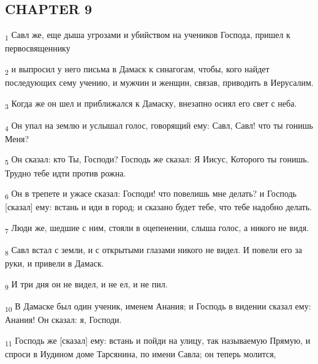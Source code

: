 \subsection{CHAPTER 9}
\begin{tcolorbox}
\textsubscript{1} Савл же, еще дыша угрозами и убийством на учеников Господа, пришел к первосвященнику
\end{tcolorbox}
\begin{tcolorbox}
\textsubscript{2} и выпросил у него письма в Дамаск к синагогам, чтобы, кого найдет последующих сему учению, и мужчин и женщин, связав, приводить в Иерусалим.
\end{tcolorbox}
\begin{tcolorbox}
\textsubscript{3} Когда же он шел и приближался к Дамаску, внезапно осиял его свет с неба.
\end{tcolorbox}
\begin{tcolorbox}
\textsubscript{4} Он упал на землю и услышал голос, говорящий ему: Савл, Савл! что ты гонишь Меня?
\end{tcolorbox}
\begin{tcolorbox}
\textsubscript{5} Он сказал: кто Ты, Господи? Господь же сказал: Я Иисус, Которого ты гонишь. Трудно тебе идти против рожна.
\end{tcolorbox}
\begin{tcolorbox}
\textsubscript{6} Он в трепете и ужасе сказал: Господи! что повелишь мне делать? и Господь [сказал] ему: встань и иди в город; и сказано будет тебе, что тебе надобно делать.
\end{tcolorbox}
\begin{tcolorbox}
\textsubscript{7} Люди же, шедшие с ним, стояли в оцепенении, слыша голос, а никого не видя.
\end{tcolorbox}
\begin{tcolorbox}
\textsubscript{8} Савл встал с земли, и с открытыми глазами никого не видел. И повели его за руки, и привели в Дамаск.
\end{tcolorbox}
\begin{tcolorbox}
\textsubscript{9} И три дня он не видел, и не ел, и не пил.
\end{tcolorbox}
\begin{tcolorbox}
\textsubscript{10} В Дамаске был один ученик, именем Анания; и Господь в видении сказал ему: Анания! Он сказал: я, Господи.
\end{tcolorbox}
\begin{tcolorbox}
\textsubscript{11} Господь же [сказал] ему: встань и пойди на улицу, так называемую Прямую, и спроси в Иудином доме Тарсянина, по имени Савла; он теперь молится,
\end{tcolorbox}
